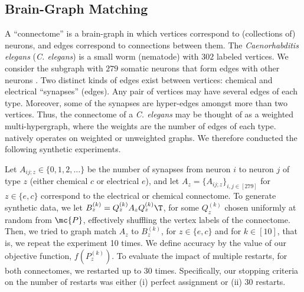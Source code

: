 \documentclass[10pt,journal,cspaper,compsoc]{IEEEtran}
\begin{document}

% 



\subsection{Brain-Graph Matching} %
\label{sub:connectome_classification}

A ``connectome'' is a brain-graph in which vertices correspond to (collections of) neurons, and edges correspond to connections between them. The \emph{Caenorhabditis elegans} (\emph{C. elegans}) is a small worm (nematode) with $302$ labeled vertices.  We consider the subgraph with $279$ somatic neurons that form edges with other neurons \cite{WhiteBrenner86, Varshney2011}.  Two distinct kinds of edges exist between vertices: chemical and electrical ``synapses'' (edges). Any pair of vertices may have several edges of each type. Moreover, some of the synapses are hyper-edges amongst more than two vertices.   Thus, the connectome of a \emph{C. elegans} may be thought of as a weighted multi-hypergraph, where the weights are the number of edges of each type.  \faqap natively operates on weighted or unweighted graphs.  We therefore conducted the following synthetic experiments.  

Let $A_{ij;z} \in \{0,1,2,\ldots\}$ be the number of synapses from neuron $i$ to neuron $j$ of type $z$ (either chemical $c$ or electrical $e$), and let $A_z=\{A_{ij;z}\}_{i,j \in [279]}$ for $z \in \{e,c\}$ correspond to the electrical or chemical connectome.  To generate synthetic data, we let $B_z^{(k)}=Q_z^{(k)} A_z {Q_z^{(k)}}\T$, for some $Q_z^{(k)}$ chosen uniformly at random from $\mc{P}$, effectively shuffling the vertex labels of the connectome.  Then, we tried to graph match $A_z$ to $B_z^{(k)}$, for $z \in \{e,c\}$ and for $k \in [10]$, that is, we repeat the experiment 10 times.  We define accuracy by the value of our objective function, $f(P_z^{(k)})$.  To evaluate the impact of multiple restarts, for both connectomes, we restarted \faqap up to 30 times.   Specifically, our stopping criteria on the number of restarts was either (i) perfect assignment or (ii) 30 restarts.
\end{document}
